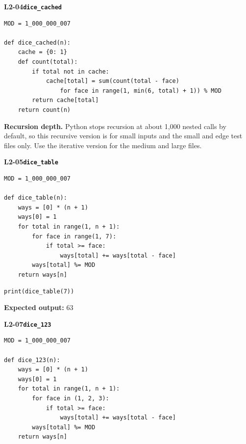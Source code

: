 \documentclass[11pt,a4paper]{article}
\begin{document}
\par\bigskip
{}
{\color{teal}\textbf{L2-04}}\quad\textbf{\texttt{dice\_cached}}\label{L2-code-dice_cached}\par
\begin{lstlisting}[style=numbered]
MOD = 1_000_000_007

def dice_cached(n):
    cache = {0: 1}
    def count(total):
        if total not in cache:
            cache[total] = sum(count(total - face)
                for face in range(1, min(6, total) + 1)) % MOD
        return cache[total]
    return count(n)
\end{lstlisting}
\textbf{Recursion depth.} Python stops recursion at about 1,000 nested calls by default, so this recursive version is for small inputs and the small and edge test files only. Use the iterative version for the medium and large files.

\par\bigskip
{}
{\color{teal}\textbf{L2-05}}\quad\textbf{\texttt{dice\_table}}\label{L2-code-dice_table}\par
\begin{lstlisting}[style=numbered]
MOD = 1_000_000_007

def dice_table(n):
    ways = [0] * (n + 1)
    ways[0] = 1
    for total in range(1, n + 1):
        for face in range(1, 7):
            if total >= face:
                ways[total] += ways[total - face]
        ways[total] %= MOD
    return ways[n]
\end{lstlisting}

\begin{lstlisting}
print(dice_table(7))
\end{lstlisting}
\textbf{Expected output:} 63
\par\bigskip
{}
{\color{teal}\textbf{L2-07}}\quad\textbf{\texttt{dice\_123}}\label{L2-code-dice_123}\par
\begin{lstlisting}[style=numbered]
MOD = 1_000_000_007

def dice_123(n):
    ways = [0] * (n + 1)
    ways[0] = 1
    for total in range(1, n + 1):
        for face in (1, 2, 3):
            if total >= face:
                ways[total] += ways[total - face]
        ways[total] %= MOD
    return ways[n]
\end{lstlisting}
\end{document}
